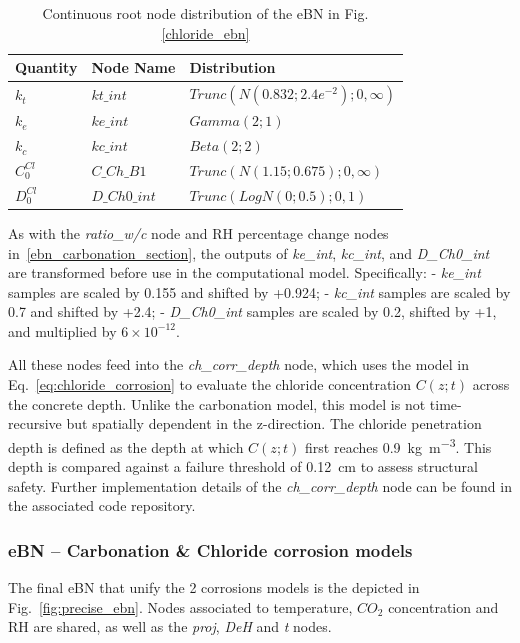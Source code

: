 \begin{table}[hbt!]
    \begin{center}
        \caption{Continuous root node distribution of the eBN in Fig.\ref{chloride_ebn}}\label{continuous_root_node_ebn_ch}
        \begin{tabular}{P{1.6cm}P{2.1cm}P{6cm}}
            \textbf{Quantity} & \textbf{Node Name} & \textbf{Distribution} \\
            \midrule
            $k_t$       & $kt \_ int$      & $Trunc(N(0.832;2.4e^{-2}); 0, \infty)$ \\
            $k_e$       & $ke \_ int$      & $Gamma(2;1)$ \\
            $k_c$       & $kc \_ int$      & $Beta(2;2)$ \\
            $C_0^{Cl}$  & $C\_ Ch\_ B1$    & $Trunc(N(1.15; 0.675); 0, \infty)$ \\
            $D_0^{Cl}$  & $D\_ Ch0\_ int$  & $Trunc(LogN(0;0.5); 0, 1)$ \\
        \end{tabular}
    \end{center}
\end{table}

As with the \textit{ratio\_w/c} node and RH percentage change nodes in~\ref{ebn_carbonation_section}, the outputs of \textit{ke\_int}, \textit{kc\_int}, and \textit{D\_Ch0\_int} are transformed before use in the computational model. Specifically:
- \textit{ke\_int} samples are scaled by 0.155 and shifted by +0.924;
- \textit{kc\_int} samples are scaled by 0.7 and shifted by +2.4;
- \textit{D\_Ch0\_int} samples are scaled by 0.2, shifted by +1, and multiplied by $6 \times 10^{-12}$.

All these nodes feed into the \textit{ch\_corr\_depth} node, which uses the model in Eq.~\ref{eq:chloride_corrosion} to evaluate the chloride concentration $C(z;t)$ across the concrete depth. Unlike the carbonation model, this model is not time-recursive but spatially dependent in the z-direction. The chloride penetration depth is defined as the depth at which $C(z;t)$ first reaches \SI{0.9}{\kilogram\per\cubic\meter}. This depth is compared against a failure threshold of \SI{0.12}{\centi\meter} to assess structural safety.
Further implementation details of the \textit{ch\_corr\_depth} node can be found in the associated code repository.

\subsubsection{eBN -- Carbonation \& Chloride corrosion models}
The final eBN that unify the 2 corrosions models is the depicted in Fig.~\ref{fig:precise_ebn}. Nodes associated to temperature, $CO_2$ concentration and RH are shared, as well as the \textit{proj}, \textit{DeH} and \textit{t} nodes. 

